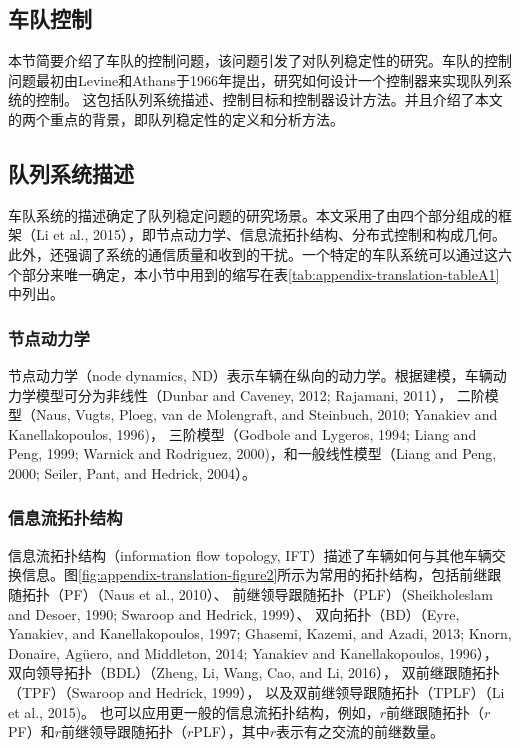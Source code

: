 \begin{translation}
\section{车队控制}

本节简要介绍了车队的控制问题，该问题引发了对队列稳定性的研究。车队的控制问题最初由Levine和Athans于1966年提出，研究如何设计一个控制器来实现队列系统的控制。
这包括队列系统描述、控制目标和控制器设计方法。并且介绍了本文的两个重点的背景，即队列稳定性的定义和分析方法。

\subsection{队列系统描述}

车队系统的描述确定了队列稳定问题的研究场景。本文采用了由四个部分组成的框架（Li et al., 2015），即节点动力学、信息流拓扑结构、分布式控制和构成几何。
此外，还强调了系统的通信质量和收到的干扰。一个特定的车队系统可以通过这六个部分来唯一确定，本小节中用到的缩写在表\ref{tab:appendix-translation-tableA1}中列出。

\subsubsection{节点动力学}

节点动力学（node dynamics, ND）表示车辆在纵向的动力学。根据建模，车辆动力学模型可分为非线性（Dunbar and Caveney, 2012; Rajamani, 2011），
二阶模型（Naus, Vugts, Ploeg, van de Molengraft, and Steinbuch, 2010; Yanakiev and Kanellakopoulos, 1996)，
三阶模型（Godbole and Lygeros, 1994; Liang and Peng, 1999; Warnick and Rodriguez, 2000)，和一般线性模型（Liang and Peng, 2000; Seiler, Pant, and Hedrick, 2004）。

\subsubsection{信息流拓扑结构}

信息流拓扑结构（information flow topology, IFT）描述了车辆如何与其他车辆交换信息。图\ref{fig:appendix-translation-figure2}所示为常用的拓扑结构，包括前继跟随拓扑（PF）（Naus et al., 2010）、
前继领导跟随拓扑（PLF）（Sheikholeslam and Desoer, 1990; Swaroop and Hedrick, 1999）、
双向拓扑（BD）（Eyre, Yanakiev, and Kanellakopoulos, 1997; Ghasemi, Kazemi, and Azadi, 2013; Knorn, Donaire, Agüero, and Middleton, 2014; Yanakiev and Kanellakopoulos, 1996），
双向领导拓扑（BDL）（Zheng, Li, Wang, Cao, and Li, 2016），
双前继跟随拓扑（TPF）（Swaroop and Hedrick, 1999），
以及双前继领导跟随拓扑（TPLF）（Li et al., 2015)。
也可以应用更一般的信息流拓扑结构，例如，$r$前继跟随拓扑（$r$PF）和$r$前继领导跟随拓扑（$r$PLF），其中$r$表示有之交流的前继数量。


\end{translation}
